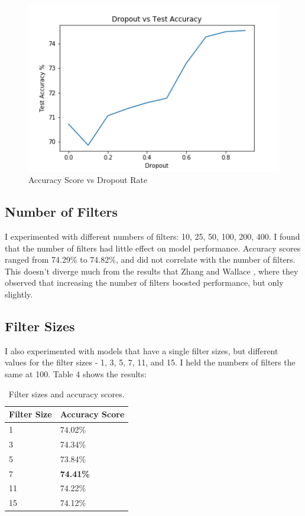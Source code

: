 \documentclass[11pt,a4paper]{article}
\begin{document}
	\begin{figure}[h]
		\begin{center}
			\includegraphics[scale=0.5]{dropout}
			\caption[scale=0.75]{Accuracy Score vs Dropout Rate}
		\end{center}
	\end{figure}
	
	
	\subsection{Number of Filters}
	I experimented with different numbers of filters: 10, 25, 50, 100, 200, 400. I found that the number of filters had little effect on model performance. Accuracy scores ranged from 74.29\% to 74.82\%, and did not correlate with the number of filters. This doesn't diverge much from the results that Zhang and Wallace \cite{Zhang}, where they observed that increasing the number of filters boosted performance, but only slightly.
	
	
	\subsection{Filter Sizes}
	I also experimented with models that have a single filter sizes, but different values for the filter sizes - 1, 3, 5, 7, 11, and 15. I held the numbers of filters the same at 100. Table 4 shows the results:
	\begin{table}[h]
		\begin{center}
			\begin{tabular}{|l|l|}
				\hline \textbf{Filter Size} & \textbf{Accuracy Score} \\ \hline
				1 & 74.02\% \\
				3 & 74.34\% \\
				5 & 73.84\% \\
				7 & \textbf{74.41\%} \\
				11 & 74.22\% \\
				15 & 74.12\% \\
				\hline
			\end{tabular}
			\caption[scale=0.75]{Filter sizes and accuracy scores.}
		\end{center}
	\end{table}
	
\end{document}
